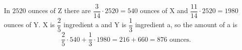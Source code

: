 In $2520$ ounces of Z there are $\dfrac{3}{14}\cdot2520=540$ ounces of X and $\dfrac{11}{14}\cdot2520=1980$ ounces of Y. X is $\dfrac25$ ingredient a and Y is $\dfrac13$ ingredient a, so the amount of a is
\[\dfrac25\cdot540+\dfrac13\cdot1980=216+660=\boxed{876}\text{ ounces}.\]
